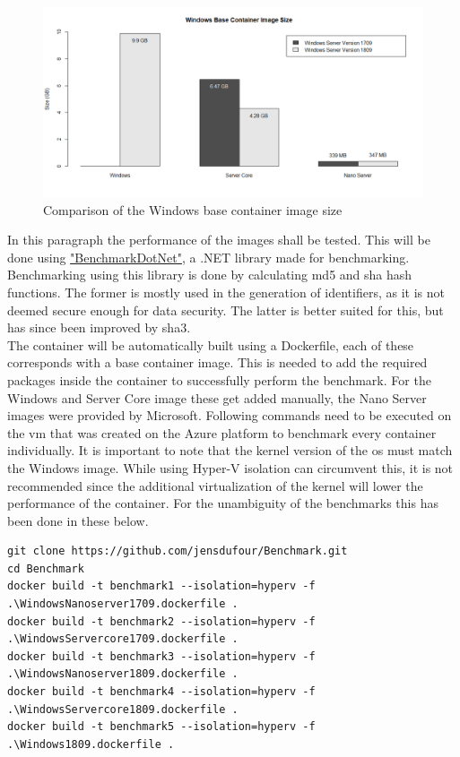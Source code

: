\begin{figure}[h]
	\captionsetup{width=0.8\linewidth}
	\includegraphics[width=0.9\linewidth]{img/Container_size.png}
	\centering
	\caption{Comparison of the Windows base container image size}
	\label{fig:container_size}	
\end{figure}

In this paragraph the performance of the images shall be tested. This will be done using \href{https://benchmarkdotnet.org/}{"BenchmarkDotNet"}, a .NET library made for benchmarking. \autocite{Akinshin2019} Benchmarking using this library is done by calculating \acrfull{md5} and \acrfull{sha} hash functions. The former is mostly used in the generation of identifiers, as it is not deemed secure enough for data security. The latter is better suited for this, but has since been improved by \acrfull{sha3}. \autocite{Enkov2017}
\\
The container will be automatically built using a Dockerfile, each of these corresponds with a base container image. This is needed to add the required packages inside the container to successfully perform the benchmark. For the Windows and Server Core image these get added manually, the Nano Server images were provided by Microsoft. Following commands need to be executed on the \acrshort{vm} that was created on the Azure platform to benchmark every container individually. It is important to note that the kernel version of the \acrshort{os} must match the Windows image. While using Hyper-V isolation can circumvent this, it is not recommended since the additional virtualization of the kernel will lower the performance of the container. For the unambiguity of the benchmarks this has been done in these below.

\begin{lstlisting}[breaklines]
git clone https://github.com/jensdufour/Benchmark.git
cd Benchmark	
docker build -t benchmark1 --isolation=hyperv -f .\WindowsNanoserver1709.dockerfile .
docker build -t benchmark2 --isolation=hyperv -f .\WindowsServercore1709.dockerfile .
docker build -t benchmark3 --isolation=hyperv -f .\WindowsNanoserver1809.dockerfile .
docker build -t benchmark4 --isolation=hyperv -f .\WindowsServercore1809.dockerfile .
docker build -t benchmark5 --isolation=hyperv -f .\Windows1809.dockerfile .
\end{lstlisting}

